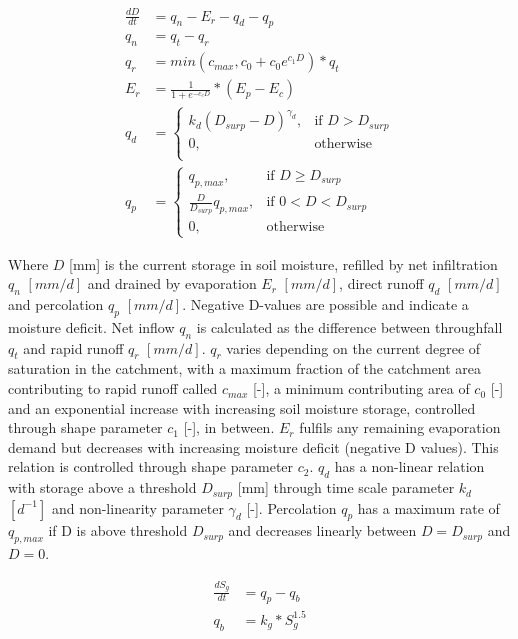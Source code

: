 {\begin{align}
	\frac{dD}{dt} &= q_n - E_r -q_d-q_p\\
	q_n &=q_t-q_r\\
	q_r &= min\left(c_{max},c_0+c_0e^{c_1D}\right)*q_t\\
	E_r &= \frac{1}{1+e^{-c_eD}}*\left(E_p-E_c\right)\\
	q_d&= \begin{cases}
		k_d\left(D_{surp}-D\right)^{\gamma_d}, &\text{if } D > D_{surp} \\
		0, &\text{otherwise} \\
	\end{cases} \\
	q_p &= \begin{cases}
		q_{p,max}, & \text{if } D\geq D_{surp} \\
		\frac{D}{D_{surp}}q_{p,max}, & \text{if } 0 < D < D_{surp}\\
		0, & \text{otherwise}
	\end{cases}
\end{align}
} %

Where $D$ [mm] is the current storage in soil moisture, refilled by net infiltration $q_n$ $[mm/d]$ and drained by evaporation $E_r$ $[mm/d]$, direct runoff $q_d$ $[mm/d]$ and percolation $q_p$ $[mm/d]$. 
Negative D-values are possible and indicate a moisture deficit. 
Net inflow $q_n$ is calculated as the difference between throughfall $q_t$ and rapid runoff $q_r$ $[mm/d]$.
$q_r$ varies depending on the current degree of saturation in the catchment, with a maximum fraction of the catchment area contributing to rapid runoff called $c_{max}$ [-], a minimum contributing area of $c_0$ [-] and an exponential increase with increasing soil moisture storage, controlled through shape parameter $c_1$ [-], in between.
$E_r$ fulfils any remaining evaporation demand but decreases with increasing moisture deficit (negative D values).
This relation is controlled through shape parameter $c_2$.
$q_d$ has a non-linear relation with storage above a threshold $D_{surp}$ [mm] through time scale parameter $k_d$ $[d^{-1}]$ and non-linearity parameter $\gamma_d$ [-].
Percolation $q_p$ has a maximum rate of $q_{p,max}$ if D is above threshold $D_{surp}$ and decreases linearly between $D=D_{surp}$ and $D=0$.

\begin{align}	
	\frac{dS_g}{dt} &= q_p - q_b\\
	q_b &= k_g*S_g^{1.5}
\end{align}
  
